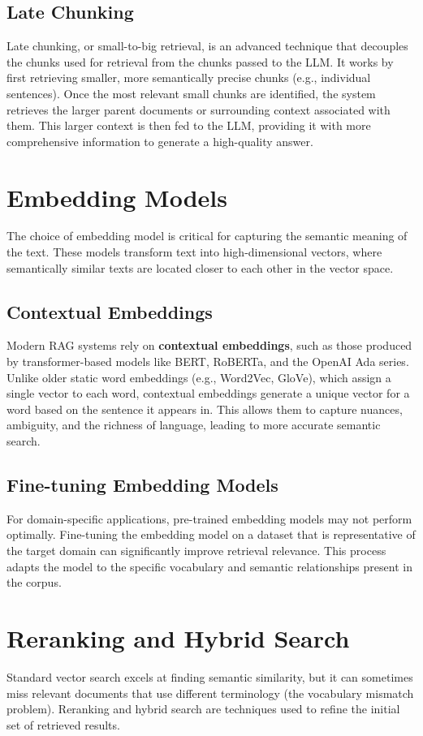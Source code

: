 \subsection{Late Chunking}
Late chunking, or small-to-big retrieval, is an advanced technique that decouples the chunks used for retrieval from the chunks passed to the LLM. It works by first retrieving smaller, more semantically precise chunks (e.g., individual sentences). Once the most relevant small chunks are identified, the system retrieves the larger parent documents or surrounding context associated with them. This larger context is then fed to the LLM, providing it with more comprehensive information to generate a high-quality answer.

\section{Embedding Models}
The choice of embedding model is critical for capturing the semantic meaning of the text. These models transform text into high-dimensional vectors, where semantically similar texts are located closer to each other in the vector space.

\subsection{Contextual Embeddings}
Modern RAG systems rely on \textbf{contextual embeddings}, such as those produced by transformer-based models like BERT, RoBERTa, and the OpenAI Ada series. Unlike older static word embeddings (e.g., Word2Vec, GloVe), which assign a single vector to each word, contextual embeddings generate a unique vector for a word based on the sentence it appears in. This allows them to capture nuances, ambiguity, and the richness of language, leading to more accurate semantic search.

\subsection{Fine-tuning Embedding Models}
For domain-specific applications, pre-trained embedding models may not perform optimally. Fine-tuning the embedding model on a dataset that is representative of the target domain can significantly improve retrieval relevance. This process adapts the model to the specific vocabulary and semantic relationships present in the corpus.

\section{Reranking and Hybrid Search}
Standard vector search excels at finding semantic similarity, but it can sometimes miss relevant documents that use different terminology (the vocabulary mismatch problem). Reranking and hybrid search are techniques used to refine the initial set of retrieved results.

